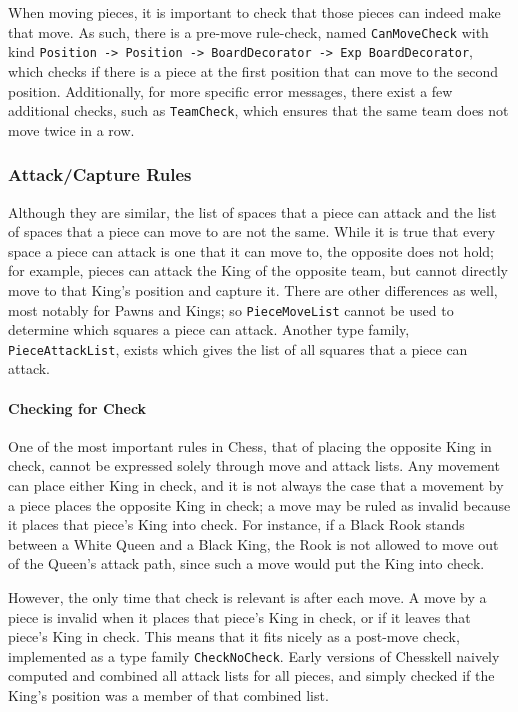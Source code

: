 \documentclass[12pt, a4paper, bibliography=totocnumbered]{scrreprt}
\newcommand{\inline}[1]{\lstinline[basicstyle=\ttfamily\footnotesize]{#1}}
\begin{document}
When moving pieces, it is important to check that those pieces can indeed make that move. As such, there is a pre-move rule-check, named \inline{CanMoveCheck} with kind \inline{Position -> Position -> BoardDecorator -> Exp BoardDecorator}, which checks if there is a piece at the first position that can move to the second position. Additionally, for more specific error messages, there exist a few additional checks, such as \inline{TeamCheck}, which ensures that the same team does not move twice in a row.

\subsubsection{Attack/Capture Rules}

Although they are similar, the list of spaces that a piece can attack and the list of spaces that a piece can move to are not the same. While it is true that every space a piece can attack is one that it can move to, the opposite does not hold; for example, pieces can attack the King of the opposite team, but cannot directly move to that King's position and capture it. There are other differences as well, most notably for Pawns and Kings; so \inline{PieceMoveList} cannot be used to determine which squares a piece can attack. Another type family, \inline{PieceAttackList}, exists which gives the list of all squares that a piece can attack.

\paragraph{Checking for Check} \label{checksection}

One of the most important rules in Chess, that of placing the opposite King in check, cannot be expressed solely through move and attack lists. Any movement can place either King in check, and it is not always the case that a movement by a piece places the opposite King in check; a move may be ruled as invalid because it places that piece's King into check. For instance, if a Black Rook stands between a White Queen and a Black King, the Rook is not allowed to move out of the Queen's attack path, since such a move would put the King into check.

However, the only time that check is relevant is after each move. A move by a piece is invalid when it places that piece's King in check, or if it leaves that piece's King in check. This means that it fits nicely as a post-move check, implemented as a type family \inline{CheckNoCheck}. Early versions of Chesskell naively computed and combined all attack lists for all pieces, and simply checked if the King's position was a member of that combined list.
\end{document}

